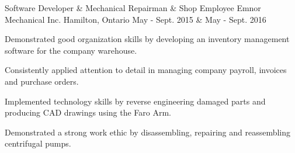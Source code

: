 \begin{cventries}
  \cventry
    {Software Developer \& Mechanical Repairman \& Shop Employee} %
    {Emnor Mechanical Inc.} %
    {Hamilton, Ontario} %
    {May - Sept. 2015 \& May - Sept. 2016} %
    {
      \begin{cvitems} %
        \item {Demonstrated good organization skills by developing an inventory management software for the company warehouse.}
        \item {Consistently applied attention to detail in managing company payroll, invoices and purchase orders.}
        \item {Implemented technology skills by reverse engineering damaged parts and producing CAD drawings using the Faro Arm.}
        \item {Demonstrated a strong work ethic by disassembling, repairing and reassembling centrifugal pumps.}
      \end{cvitems}
    }


\end{cventries}

